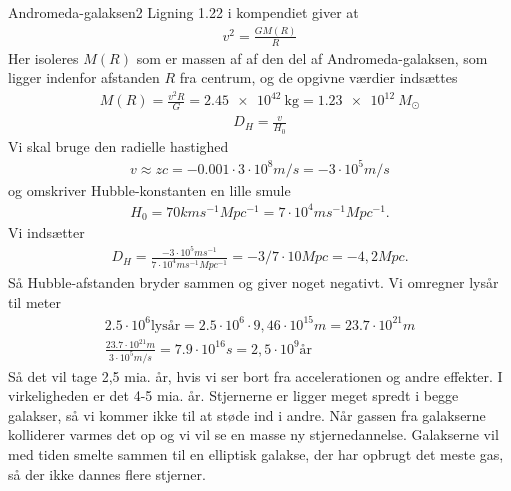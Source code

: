 \begin{opgave}{Andromeda-galaksen}{2}
	\opg Ligning 1.22 i kompendiet giver at
	\begin{align*}
	v^2 = \frac{GM(R)}{R}
	\end{align*}
	Her isoleres $M(R)$ som er massen af af den del af Andromeda-galaksen, som ligger indenfor afstanden $R$ fra centrum, og de opgivne værdier indsættes
	\begin{align*}
	M(R) = \frac{v^2R}{G} = \SI{2,45e42}{\kilo\gram} = \SI{1,23e12}{M_\odot}
	\end{align*}
	\opg 
	\begin{align}
	D_H=\frac{v}{H_0} 
	\end{align}
	Vi skal bruge den radielle hastighed
	\begin{align}
	v \approx z c = -0.001 \cdot 3\cdot 10^8 m/s =-3\cdot 10^5 m/s
	\end{align}
	og omskriver Hubble-konstanten en lille smule
	\begin{align}
	H_0=70 km s^{-1} Mpc^{-1} = 7 \cdot 10^4 m s^{-1} Mpc^{-1}.
	\end{align}
	Vi indsætter
	\begin{align}
	D_H=\frac{-3\cdot 10^5 m s^{-1}} {7 \cdot 10^4 m s^{-1} Mpc^{-1}} = - 3/7 \cdot 10 Mpc = - 4,2 Mpc.
	\end{align}
	Så Hubble-afstanden bryder sammen og giver noget negativt.
	\opg Vi omregner lysår til meter
	\begin{align}
	2.5\cdot 10^6 \text{lysår} = 2.5\cdot 10^6 \cdot 9,46 \cdot 10^15 m = 23.7 \cdot 10^21 m\\
	\frac{23.7 \cdot 10^21 m}{3\cdot 10^5 m/s} = 7.9 \cdot 10^16 s = 2,5 \cdot 10^9 \text{år}
	\end{align} 
	Så det vil tage 2,5 mia. år, hvis vi ser bort fra accelerationen og andre effekter. I virkeligheden er det 4-5 mia. år.
	Stjernerne er ligger meget spredt i begge galakser, så vi kommer ikke til at støde ind i andre. Når gassen fra galakserne kolliderer varmes det op og vi vil se en masse ny stjernedannelse. Galakserne vil med tiden smelte sammen til en elliptisk galakse, der har opbrugt det meste gas, så der ikke dannes flere stjerner. 
\end{opgave}

